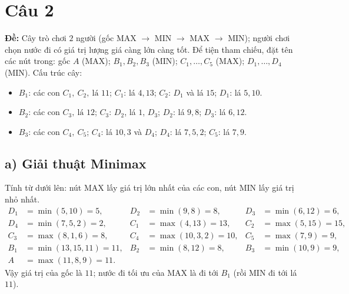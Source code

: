 \documentclass[a4paper,11pt]{article}
\newcommand{\cm}{,\allowbreak\ }
\newcommand{\cau}[1]{\section*{Câu #1}\addcontentsline{toc}{section}{Câu #1}}
\begin{document}
\clearpage
\cau{2}
\textbf{Đề:} Cây trò chơi $2$ người (gốc MAX $\to$ MIN $\to$ MAX $\to$ MIN); người chơi chọn nước đi có giá trị lượng giá càng lớn càng tốt. Để tiện tham chiếu, đặt tên các nút trong:
gốc $A$ (MAX); $B_1,B_2,B_3$ (MIN); $C_1,\dots,C_5$ (MAX); $D_1,\dots,D_4$ (MIN). Cấu trúc cây:
\begin{itemize}[nosep]
  \item $B_1$: các con $C_1\cm C_2\cm \text{lá }11$; \quad $C_1$: lá $4,13$; \quad $C_2$: $D_1$ và lá $15$; \quad $D_1$: lá $5,10$.
  \item $B_2$: các con $C_3\cm \text{lá }12$; \quad $C_3$: $D_2$, lá $1$, $D_3$; \quad $D_2$: lá $9,8$; \quad $D_3$: lá $6,12$.
  \item $B_3$: các con $C_4\cm C_5$; \quad $C_4$: lá $10,3$ và $D_4$; \quad $D_4$: lá $7,5,2$; \quad $C_5$: lá $7,9$.
\end{itemize}

\subsection*{a) Giải thuật Minimax}
Tính từ dưới lên: nút MAX lấy giá trị lớn nhất của các con, nút MIN lấy giá trị nhỏ nhất.
\begin{align*}
D_1&=\min(5,10)=5, & D_2&=\min(9,8)=8, & D_3&=\min(6,12)=6, \\
D_4&=\min(7,5,2)=2, & C_1&=\max(4,13)=13, & C_2&=\max(5,15)=15, \\
C_3&=\max(8,1,6)=8, & C_4&=\max(10,3,2)=10, & C_5&=\max(7,9)=9,\\
B_1&=\min(13,15,11)=11, & B_2&=\min(8,12)=8, & B_3&=\min(10,9)=9,\\
A&=\max(11,8,9)=11.
\end{align*}
Vậy giá trị của gốc là $11$; nước đi tối ưu của MAX là đi tới $B_1$ (rồi MIN đi tới lá $11$).
\end{document}
